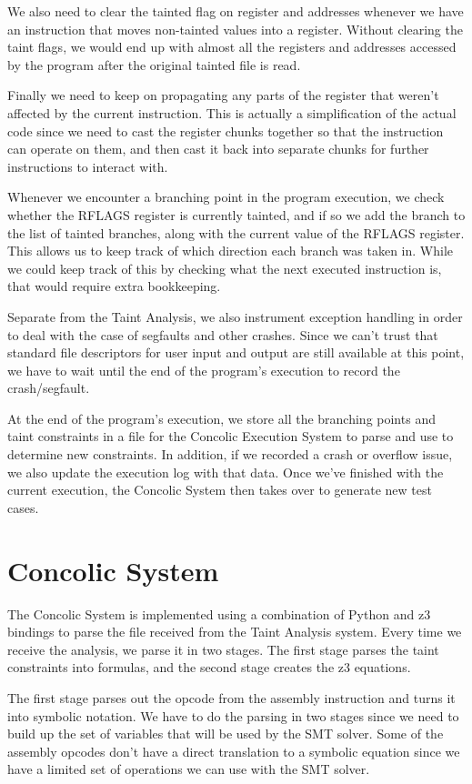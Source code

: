 We also need to clear the tainted flag on register and addresses whenever we
have an instruction that moves non-tainted values into a register. Without
clearing the taint flags, we would end up with almost all the registers and
addresses accessed by the program after the original tainted file is read.

Finally we need to keep on propagating any parts of the register that weren't
affected by the current instruction. This is actually a simplification of the
actual code since we need to cast the register chunks together so that the
instruction can operate on them, and then cast it back into separate chunks for
further instructions to interact with.

Whenever we encounter a branching point in the program execution, we check
whether the RFLAGS register is currently tainted, and if so we add the branch to
the list of tainted branches, along with the current value of the RFLAGS
register. This allows us to keep track of which direction each branch was taken
in. While we could keep track of this by checking what the next executed
instruction is, that would require extra bookkeeping.

Separate from the Taint Analysis, we also instrument exception handling in order
to deal with the case of segfaults and other crashes. Since we can't trust that
standard file descriptors for user input and output are still available at this
point, we have to wait until the end of the program's execution to record the
crash/segfault.

At the end of the program's execution, we store all the branching points and
taint constraints in a file for the Concolic Execution System to parse and use
to determine new constraints. In addition, if we recorded a crash or overflow
issue, we also update the execution log with that data. Once we've finished with
the current execution, the Concolic System then takes over to generate new test
cases.

\section{Concolic System}
The Concolic System is implemented using a combination of Python and z3 bindings
to parse the file received from the Taint Analysis system. Every time we receive
the analysis, we parse it in two stages. The first stage parses the taint
constraints into formulas, and the second stage creates the z3 equations.

The first stage parses out the opcode from the assembly instruction and turns it
into symbolic notation. We have to do the parsing in two stages since we need to
build up the set of variables that will be used by the SMT solver. Some of the
assembly opcodes don't have a direct translation to a symbolic equation since we
have a limited set of operations we can use with the SMT solver.

